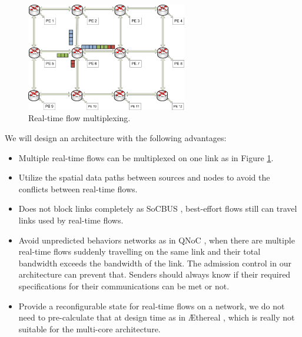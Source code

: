 \documentclass[a4]{article}
\begin{document}
\begin{figure}[htbp]
\centering
\includegraphics[width=7cm]{pics/Multiplex2}
\caption[Real time flow multiplexing.]
{Real-time flow multiplexing.}\label{fig:FlowMultiplex}
\end{figure}

We will design an architecture with the following advantages:
\begin{itemize}
\item Multiple real-time flows can be multiplexed on one link
\cite{Ferrari90ascheme} as in Figure \ref{fig:FlowMultiplex}.
\item Utilize the spatial data paths between sources and nodes to avoid the 
conflicts between real-time flows.
\item Does not block links completely as SoCBUS \cite{SoCBUS}, best-effort flows 
still can travel links used by real-time flows.
\item Avoid unpredicted behaviors networks as in QNoC \cite{QNoC}, when there are 
multiple real-time flows suddenly travelling on the same link and their total bandwidth 
exceeds the bandwidth of the link. The admission control in our architecture can 
prevent that. Senders should always know if their required specifications for 
their communications can be met or not. 
\item Provide a reconfigurable state for real-time flows on a network, we do not 
need to pre-calculate that at design time as in \AE thereal \cite{Goossens_chapter4}, 
which is really not suitable for the multi-core architecture.
\end{itemize}
\end{document}
